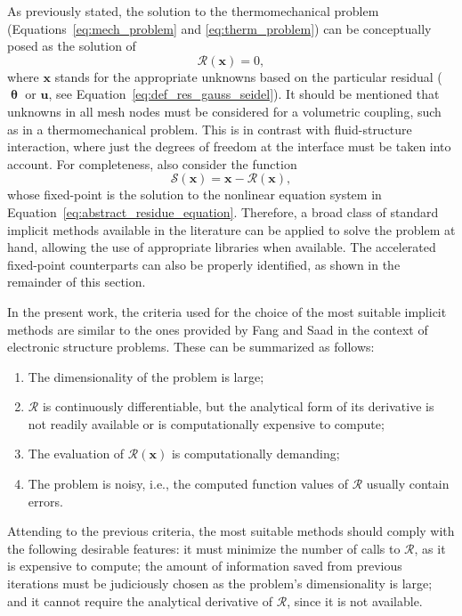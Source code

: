      As previously stated, the solution to the thermomechanical problem (Equations~\eqref{eq:mech_problem} and \eqref{eq:therm_problem}) can be conceptually posed as the solution of
     \begin{equation} \label{eq:abstract_residue_equation}
       \bm{\mathcal{R}}(\mathbf{x}) = 0,
     \end{equation}
     where $\mathbf x$ stands for the appropriate unknowns based on the particular residual ($\bm \uptheta$ or $\mathbf u$, see Equation~\eqref{eq:def_res_gauss_seidel}).
     It should be mentioned that unknowns in all mesh nodes must be considered for a volumetric coupling, such as in a thermomechanical problem.
     This is in contrast with fluid-structure interaction, where just the degrees of freedom at the interface must be taken into account.
     For completeness, also consider the function
     \begin{equation}
       \bm{\mathcal{S}}(\mathbf{x}) = \mathbf{x} - \bm{\mathcal{R}}(\mathbf{x}),
     \end{equation}
     whose fixed-point is the solution to the nonlinear equation system in Equation~\eqref{eq:abstract_residue_equation}.
     Therefore, a broad class of standard implicit methods available in the literature can be applied to solve the problem at hand, allowing the use of appropriate libraries when available.
     The accelerated fixed-point counterparts can also be properly identified, as shown in the remainder of this section.

     In the present work, the criteria used for the choice of the most suitable implicit methods are similar to the ones provided by Fang and Saad \citep{fang_two_2009} in the context of electronic structure problems.
     These can be summarized as follows:
     \begin{enumerate}
     \item The dimensionality of the problem is large;
     \item \(\bm{\mathcal{R}}\) is continuously differentiable, but the analytical form of its derivative is not readily available or is computationally expensive to compute;
     \item The evaluation of \(\bm{\mathcal{R}}(\mathbf{x})\) is computationally demanding;
     \item The problem is noisy, i.e., the computed function values of \(\bm{\mathcal{R}}\) usually contain errors.
     \end{enumerate}
     Attending to the previous criteria, the most suitable methods should comply with the following desirable features: it must minimize the number of calls to \(\bm{\mathcal{R}}\), as it is expensive to compute; the amount of information saved from previous iterations must be judiciously chosen as the problem's dimensionality is large; and it cannot require the analytical derivative of \(\bm{\mathcal{R}}\), since it is not available.

